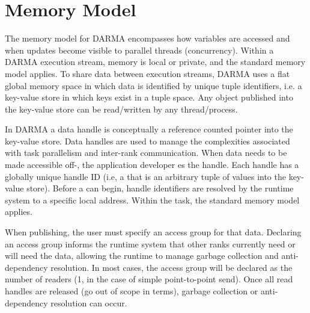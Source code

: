 
\section{Memory Model}
\label{sec:mem_model}
The memory model for \gls{DARMA} encompasses how variables are accessed %
  and when updates become visible to parallel threads (concurrency).  
Within a \gls{DARMA} \gls{execution stream}, memory is local or private, and the
standard \CC{} memory model applies. 
To share data between \glspl{execution stream}, \gls{DARMA} uses a flat global
\gls{memory space} in which data is identified by unique \gls{tuple} identifiers, i.e. a \gls{key-value
  store} in which keys exist in a \gls{tuple space}.
Any object published into the \gls{key-value store} can be read/written by any thread/process. 

In \gls{DARMA} a data \gls{handle} is conceptually a \gls{reference counted pointer} into the
\gls{key-value store}.  Data \glspl{handle} are used to manage the
complexities associated with \gls{task parallelism} and inter-\gls{rank} communication.  
When data needs to be made accessible off-, the application developer 
es the \gls{handle}.  Each \gls{handle} has a globally unique handle ID
(i.e, a  that is an arbitrary \gls{tuple} of values into the
 \gls{key-value store}).  
Before a  can begin, \gls{handle} identifiers are resolved by
the \gls{runtime system} to a specific local address. Within the task, the standard \CC{} memory model applies.

When publishing, the user must specify an \gls{access group} for that data.  
Declaring an \gls{access group} informs the \gls{runtime system} that other
\glspl{rank} currently need or will need the data,  
allowing the runtime to manage \gls{garbage collection} and \gls{anti-dependency} resolution.
In most cases, the \gls{access group} will be declared as the number of readers (1, in the case of simple point-to-point send).
Once all read \glspl{handle} are released (go out of scope in \CC{} terms),
\gls{garbage collection} or \gls{anti-dependency} resolution can occur.



